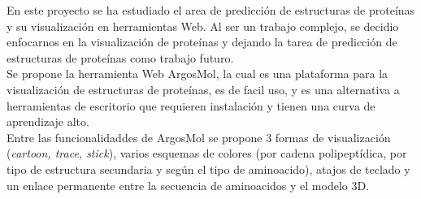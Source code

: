 \documentclass{article}
\begin{document}
En este proyecto se ha estudiado el area de predicción de estructuras de proteínas y su visualización en herramientas Web. Al ser un trabajo complejo, se decidio enfocarnos en la visualización de proteínas y dejando la tarea de predicción de estructuras de proteínas como trabajo futuro.\\

Se propone la herramienta Web ArgosMol, la cual es una plataforma para la visualización de estructuras de proteínas, es de facil uso, y es una alternativa a herramientas de escritorio que requieren instalación y tienen una curva de aprendizaje alto.\\

Entre las funcionalidaddes de ArgosMol se propone 3 formas de visualización (\textit{cartoon, trace, stick}), varios esquemas de colores (por cadena polipeptídica, por tipo de estructura secundaria y según el tipo de aminoacido), atajos de teclado y un enlace permanente entre la secuencia de aminoacidos y el modelo 3D.
	
	\clearpage
	
	
	
	
	
	
	
\end{document}
